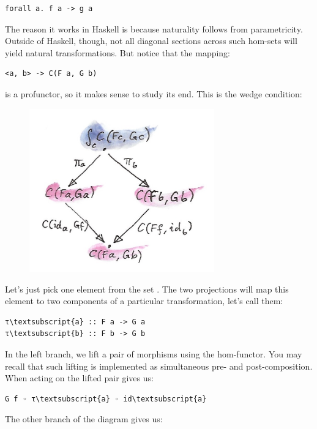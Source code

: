 \begin{verbatim}
forall a. f a -> g a
\end{verbatim}
The reason it works in Haskell is because naturality follows from
parametricity. Outside of Haskell, though, not all diagonal sections
across such hom-sets will yield natural transformations. But notice that
the mapping:

\begin{verbatim}
<a, b> -> C(F a, G b)
\end{verbatim}
is a profunctor, so it makes sense to study its end. This is the wedge
condition:

\begin{figure}[H]
\centering
\includegraphics[width=80mm]{images/end1.jpg}
\end{figure}

\noindent
Let's just pick one element from the set .
The two projections will map this element to two components of a
particular transformation, let's call them:

\begin{Verbatim}[commandchars=\\\{\}]
τ\textsubscript{a} :: F a -> G a
τ\textsubscript{b} :: F b -> G b
\end{Verbatim}
In the left branch, we lift a pair of morphisms
 using the hom-functor. You
may recall that such lifting is implemented as simultaneous pre- and
post-composition. When acting on  the lifted pair gives us:

\begin{Verbatim}[commandchars=\\\{\}]
G f ◦ τ\textsubscript{a} ◦ id\textsubscript{a}
\end{Verbatim}
The other branch of the diagram gives us:

